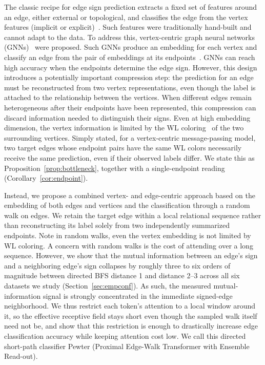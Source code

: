 \documentclass[sigconf]{acmart}
\theoremstyle{plain}
\theoremstyle{definition}
\begin{document}
The classic recipe for edge sign prediction extracts a fixed set of features around an edge, either external or topological, and classifies the edge from the vertex features (implicit or explicit)~\citep{leskovec2010predicting}. Such features were traditionally hand-built and cannot adapt to the data. To address this, vertex-centric graph neural networks (GNNs)~\citep{kipf2017semi, gilmer2017neural} were proposed. Such GNNs produce an embedding for each vertex and classify an edge from the pair of embeddings at its endpoints~\citep{derr2018signed, huang2019signed}. GNNs can reach high accuracy when the endpoints determine the edge sign. However, this design introduces a potentially important compression step: the prediction for an edge must be reconstructed from two vertex representations, even though the label is attached to the relationship between the vertices. When different edges remain heterogeneous after their endpoints have been represented, this compression can discard information needed to distinguish their signs. Even at high embedding dimension, the vertex information is limited by the WL coloring~\citep{weisfeiler1968reduction} of the two surrounding vertices.  Simply stated, for a vertex-centric message-passing model, two target edges whose endpoint pairs have the same WL colors necessarily receive the same prediction, even if their observed labels differ.  We state this as Proposition~\ref{prop:bottleneck}, together with a single-endpoint reading (Corollary~\ref{cor:endpoint}). 

Instead, we propose a combined vertex- and edge-centric approach based on the embedding of both edges and vertices and the classification through a random walk on edges. We retain the target edge within a local relational sequence rather than reconstructing its label solely from two independently summarized endpoints. Note in random walks, even the vertex embedding is not limited by WL coloring.  A concern with random walks is the cost of attending over a long sequence. However, we show that the mutual information between an edge's sign and a neighboring edge's sign collapses by roughly three to six orders of magnitude between directed BFS distance 1 and distance 2--3 across all six datasets we study (Section~\ref{sec:empconf}). As such, the measured mutual-information signal is strongly concentrated in the immediate signed-edge neighborhood. We thus restrict each token's attention to a local window around it, so the effective receptive field stays short even though the sampled walk itself need not be, and show that this restriction is enough to drastically increase edge classification accuracy while keeping attention cost low. We call this directed short-path classifier Pewter (Proximal Edge-Walk Transformer with Ensemble Read-out).
\end{document}
